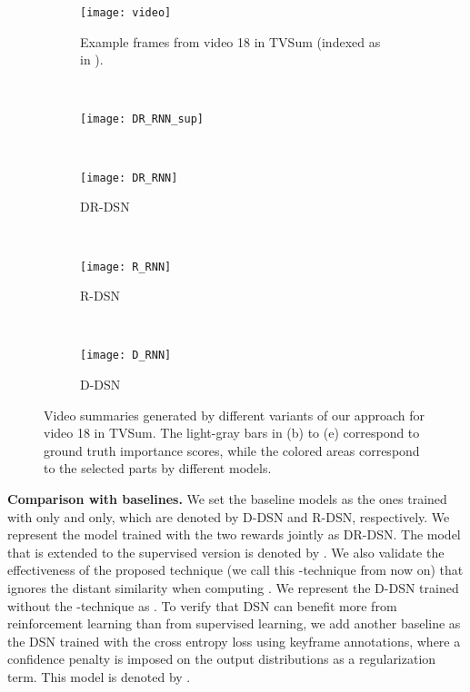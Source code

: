 \documentclass[letterpaper]{article} \usepackage{aaai18}  \usepackage{times}  \usepackage{helvet}  \usepackage{courier}  \usepackage{url}  \usepackage{graphicx}
\begin{document}
\begin{figure*}[t]
\centering
  \begin{subfigure}[b]{0.99\textwidth}
  \texttt{[image: video]}
  \caption{Example frames from video 18 in TVSum (indexed as in \cite{song2015tvsum}).}
  \label{fig:video18}
  \end{subfigure}
  ~
  \begin{subfigure}[b]{0.48\textwidth}
  \texttt{[image: DR\_RNN\_sup]}
  \caption{}
  \label{fig:summDRRNNsup}
  \end{subfigure}
  ~
  \begin{subfigure}[b]{0.48\textwidth}
  \texttt{[image: DR\_RNN]}
  \caption{DR-DSN}
  \label{fig:summDRRNN}
  \end{subfigure}
  ~
  \begin{subfigure}[b]{0.48\textwidth}
  \texttt{[image: R\_RNN]}
  \caption{R-DSN}
  \label{fig:summRRNN}
  \end{subfigure}
  ~
  \begin{subfigure}[b]{0.48\textwidth}
  \texttt{[image: D\_RNN]}
  \caption{D-DSN}
  \label{fig:summDRNN}
  \end{subfigure}
\caption{Video summaries generated by different variants of our approach for video 18 in TVSum. The light-gray bars in (b) to (e) correspond to ground truth importance scores, while the colored areas correspond to the selected parts by different models.}
\label{fig:qualitativeresults}
\end{figure*}

{\bf Comparison with baselines.} We set the baseline models as the ones trained with  only and  only, which are denoted by D-DSN and R-DSN, respectively. We represent the model trained with the two rewards jointly as DR-DSN. The model that is extended to the supervised version is denoted by . We also validate the effectiveness of the proposed technique (we call this -technique from now on) that ignores the distant similarity when computing . We represent the D-DSN trained without the -technique as \lambda. To verify that DSN can benefit more from reinforcement learning than from supervised learning, we add another baseline as the DSN trained with the cross entropy loss using keyframe annotations, where a confidence penalty \cite{pereyra2017regularizing} is imposed on the output distributions as a regularization term. This model is denoted by .
\end{document}
